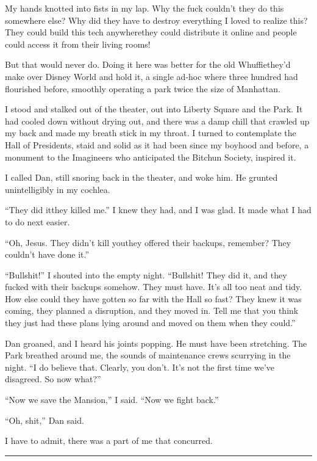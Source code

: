 My hands knotted into fists in my lap. Why the fuck couldn't they
do this somewhere else? Why did they have to destroy everything I
loved to realize this? They could build this tech anywhere{\dash}they
could distribute it online and people could access it from their
living rooms!

But that would never do. Doing it here was better for the old
Whuffie{\dash}they'd make over Disney World and hold it, a single ad-hoc
where three hundred had flourished before, smoothly operating a
park twice the size of Manhattan.

I stood and stalked out of the theater, out into Liberty Square and
the Park. It had cooled down without drying out, and there was a
damp chill that crawled up my back and made my breath stick in my
throat. I turned to contemplate the Hall of Presidents, staid and
solid as it had been since my boyhood and before, a monument to the
Imagineers who anticipated the Bitchun Society, inspired it.

I called Dan, still snoring back in the theater, and woke him. He
grunted unintelligibly in my cochlea.

“They did it{\dash}they killed me.” I knew they had, and I was glad. It
made what I had to do next easier.

“Oh, Jesus. They didn't kill you{\dash}they offered their backups,
remember? They couldn't have done it.”

“Bullshit!” I shouted into the empty night. “Bullshit! They did it,
and they fucked with their backups somehow. They must have. It's
all too neat and tidy. How else could they have gotten so far with
the Hall so fast? They knew it was coming, they planned a
disruption, and they moved in. Tell me that you think they just had
these plans lying around and moved on them when they could.”

Dan groaned, and I heard his joints popping. He must have been
stretching. The Park breathed around me, the sounds of maintenance
crews scurrying in the night. “I do believe that. Clearly, you
don't. It's not the first time we've disagreed. So now what?”

“Now we save the Mansion,” I said. “Now we fight back.”

“Oh, shit,” Dan said.

I have to admit, there was a part of me that concurred.

\begin{center}\rule{3in}{0.4pt}\end{center}

